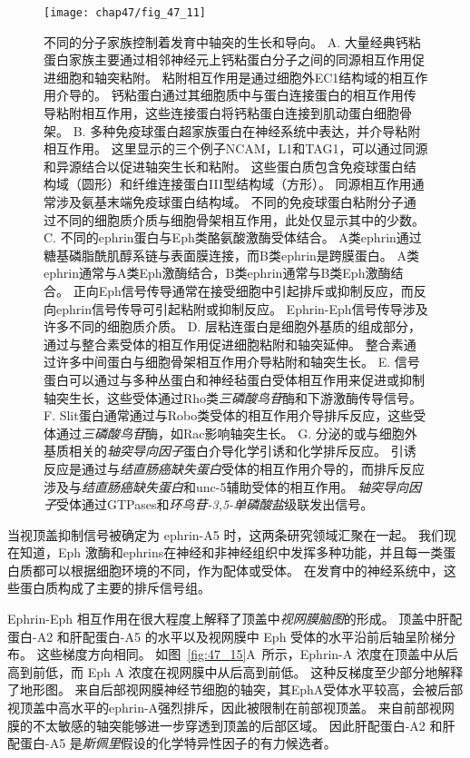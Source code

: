 \begin{figure}[htbp]
	\centering
	\texttt{[image: chap47/fig\_47\_11]}
	\caption{不同的分子家族控制着发育中轴突的生长和导向。
		A. 大量经典钙粘蛋白家族主要通过相邻神经元上钙粘蛋白分子之间的同源相互作用促进细胞和轴突粘附。
		粘附相互作用是通过细胞外EC1结构域的相互作用介导的。
		钙粘蛋白通过其细胞质中与蛋白连接蛋白的相互作用传导粘附相互作用，这些连接蛋白将钙粘蛋白连接到肌动蛋白细胞骨架。
		B. 多种免疫球蛋白超家族蛋白在神经系统中表达，并介导粘附相互作用。
		这里显示的三个例子NCAM，L1和TAG1，可以通过同源和异源结合以促进轴突生长和粘附。
		这些蛋白质包含免疫球蛋白结构域（圆形）和纤维连接蛋白III型结构域（方形）。
		同源相互作用通常涉及氨基末端免疫球蛋白结构域。
		不同的免疫球蛋白粘附分子通过不同的细胞质介质与细胞骨架相互作用，此处仅显示其中的少数。
		C. 不同的ephrin蛋白与Eph类酪氨酸激酶受体结合。
		A类ephrin通过糖基磷脂酰肌醇系链与表面膜连接，而B类ephrin是跨膜蛋白。
		A类ephrin通常与A类Eph激酶结合，B类ephrin通常与B类Eph激酶结合。
		正向Eph信号传导通常在接受细胞中引起排斥或抑制反应，而反向ephrin信号传导可引起粘附或抑制反应。
		Ephrin-Eph信号传导涉及许多不同的细胞质介质。
		D. 层粘连蛋白是细胞外基质的组成部分，通过与整合素受体的相互作用促进细胞粘附和轴突延伸。
		整合素通过许多中间蛋白与细胞骨架相互作用介导粘附和轴突生长。
		E. 信号蛋白可以通过与多种丛蛋白和神经毡蛋白受体相互作用来促进或抑制轴突生长，这些受体通过Rho类\textit{三磷酸鸟苷}酶和下游激酶传导信号。
		F. Slit蛋白通常通过与Robo类受体的相互作用介导排斥反应，这些受体通过\textit{三磷酸鸟苷}酶，如Rac影响轴突生长。
		G. 分泌的或与细胞外基质相关的\textit{轴突导向因子}蛋白介导化学引诱和化学排斥反应。
		引诱反应是通过与\textit{结直肠癌缺失蛋白}受体的相互作用介导的，而排斥反应涉及与\textit{结直肠癌缺失蛋白}和unc-5辅助受体的相互作用。
		\textit{轴突导向因子}受体通过GTPases和\textit{环鸟苷-3,5-单磷酸盐}级联发出信号。}
	\label{fig:47_11}
\end{figure}


当视顶盖抑制信号被确定为 ephrin-A5 时，这两条研究领域汇聚在一起。
我们现在知道，Eph 激酶和ephrins在神经和非神经组织中发挥多种功能，并且每一类蛋白质都可以根据细胞环境的不同，作为配体或受体。
在发育中的神经系统中，这些蛋白质构成了主要的排斥信号组。


Ephrin-Eph 相互作用在很大程度上解释了顶盖中\textit{视网膜脑图}的形成。
顶盖中肝配蛋白-A2 和肝配蛋白-A5 的水平以及视网膜中 Eph 受体的水平沿前后轴呈阶梯分布。
这些梯度方向相同。
如图~\ref{fig:47_15}A~所示，Ephrin-A 浓度在顶盖中从后高到前低，而 Eph A 浓度在视网膜中从后高到前低。
这种反梯度至少部分地解释了地形图。
来自后部视网膜神经节细胞的轴突，其EphA受体水平较高，会被后部视顶盖中高水平的ephrin-A强烈排斥，因此被限制在前部视顶盖。
来自前部视网膜的不太敏感的轴突能够进一步穿透到顶盖的后部区域。
因此肝配蛋白-A2 和肝配蛋白-A5 是\textit{斯佩里}假设的化学特异性因子的有力候选者。


